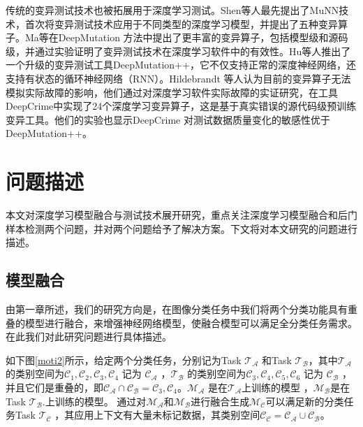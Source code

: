 \documentclass[fontset=macnew,UTF8]{article} %
\begin{document}
传统的变异测试技术也被拓展用于深度学习测试。Shen等人最先提出了MuNN技术\cite{shen2018munn}，首次将变异测试技术应用于不同类型的深度学习模型，并提出了五种变异算子。Ma等在DeepMutation 方法\cite{ma2018deepmutation}中提出了更丰富的变异算子，包括模型级和源码级，并通过实验证明了变异测试技术在深度学习软件中的有效性。Hu等人\cite{hu2019deepmutation++}推出了一个升级的变异测试工具DeepMutation++，它不仅支持正常的深度神经网络，还支持有状态的循环神经网络（RNN）。Hildebrandt 等人认为目前的变异算子无法模拟实际故障的影响，他们通过对深度学习软件实际故障的实证研究，在工具DeepCrime\cite{humbatova2021deepcrime}中实现了24个深度学习变异算子，这是基于真实错误的源代码级预训练变异工具。他们的实验也显示DeepCrime 对测试数据质量变化的敏感性优于DeepMutation++。
	

\section{问题描述}
本文对深度学习模型融合与测试技术展开研究，重点关注深度学习模型融合和后门样本检测两个问题，并对两个问题给予了解决方案。下文将对本文研究的问题进行描述。

\subsection{模型融合}
由第一章所述，我们的研究方向是，在图像分类任务中我们将两个分类功能具有重叠的模型进行融合，来增强神经网络模型，使融合模型可以满足全分类任务需求。在此我们对此研究问题进行具体描述。

如下图\ref{moti2}所示，给定两个分类任务，分别记为Task $\mathcal{T}_\mathcal{A}$ 和Task $\mathcal{T}_\mathcal{B}$，其中$\mathcal{T}_\mathcal{A}$ 的类别空间为$\mathcal{C}_1, \mathcal{C}_2, \mathcal{C}_3, \mathcal{C}_4$ 记为 $\mathcal{C_A}$ ，$\mathcal{T_B}$ 的类别空间为$\mathcal{C}_3, \mathcal{C}_4, \mathcal{C}_5, \mathcal{C}_6$ 记为 $\mathcal{C_B}$ ，并且它们是重叠的，即$\mathcal{C_A}\cap \mathcal{C_B} =   {{\mathcal{C}_3,\mathcal{C}_4}}$。$\mathcal{M_A}$ 是在$\mathcal{T_A}$上训练的模型 ，$\mathcal{M_B}$是在Task $\mathcal{T_B}$.上训练的模型。 
通过对$\mathcal{M_A}$和$\mathcal{M_B}$进行融合生成$\mathcal{M_C}$可以满足新的分类任务Task $\mathcal{T_C}$ ，其应用上下文有大量未标记数据，其类别空间$\mathcal{C_C = C_A \cup C_B}$。
\end{document}
